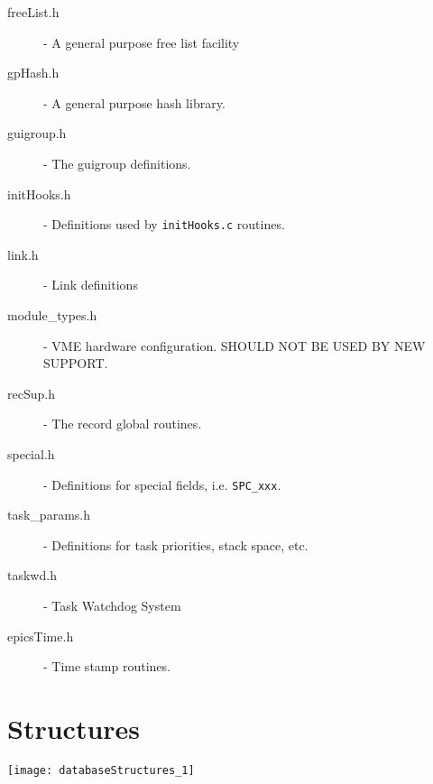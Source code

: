 \begin{description}
\item[freeList.h] - A general purpose free list facility

\item[gpHash.h] - A general purpose hash library.

\item[guigroup.h] - The guigroup definitions.

\item[initHooks.h] - Definitions used by \verb|initHooks.c| routines.

\item[link.h] - Link definitions

\item[module\_types.h] - VME hardware configuration. SHOULD NOT BE USED BY NEW SUPPORT.

\item[recSup.h] - The record global routines.

\item[special.h] - Definitions for special fields, i.e. \verb|SPC_xxx|.

\item[task\_params.h] - Definitions for task priorities, stack space, etc.

\item[taskwd.h] - Task Watchdog System

\item[epicsTime.h] - Time stamp routines.

\end{description}

\newpage

\section{Structures}

\begin{center}

\texttt{[image: databaseStructures\_1]}

\end{center}
